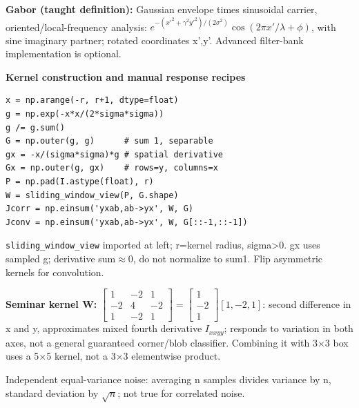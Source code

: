 \documentclass[a4paper]{article}
\newcommand{\key}[1]{\textbf{#1}}
\newcommand{\Topic}[1]{\par\vspace{1.7pt}\noindent
  {\fontsize{7.7}{8.0}\selectfont\bfseries #1}\par\vspace{0.3pt}}
\newcommand{\smat}[1]{\left[\begin{smallmatrix}#1\end{smallmatrix}\right]}
\newcounter{sheet}
\newcounter{sheetcolumn}
\newlength{\colwidth}
\newenvironment{sheetcol}[1][7.0]{\stepcounter{sheetcolumn}
  \begin{lrbox}{\columnbox}\begin{minipage}[t]{\colwidth}\vspace{0pt}
  \fontsize{#1}{\dimexpr#1pt+0.6pt\relax}\selectfont}
  {\end{minipage}\end{lrbox}
  \typeout{CV1COL|\thesheet|\thesheetcolumn|\the\dimexpr\ht\columnbox+\dp\columnbox\relax}
  \usebox{\columnbox}\ignorespacesafterend}
\newcommand{\Sep}{\hfill}
\begin{document}
\begin{sheetcol}[6.54]
\key{Gabor (taught definition):} Gaussian envelope times sinusoidal carrier, oriented/local-frequency analysis: \(e^{-(x'^2+\gamma^2y'^2)/(2\sigma^2)}\cos(2\pi x'/\lambda+\phi)\), with sine imaginary partner; rotated coordinates x',y'. Advanced filter-bank implementation is optional.

\Topic{Kernel construction and manual response recipes}
\begin{lstlisting}
x = np.arange(-r, r+1, dtype=float)
g = np.exp(-x*x/(2*sigma*sigma))
g /= g.sum()
G = np.outer(g, g)      # sum 1, separable
gx = -x/(sigma*sigma)*g # spatial derivative
Gx = np.outer(g, gx)    # rows=y, columns=x
P = np.pad(I.astype(float), r)
W = sliding_window_view(P, G.shape)
Jcorr = np.einsum('yxab,ab->yx', W, G)
Jconv = np.einsum('yxab,ab->yx', W, G[::-1,::-1])
\end{lstlisting}
\texttt{sliding\_window\_view} imported at left; r=kernel radius, sigma>0. gx uses sampled g; derivative sum\(\approx0\), do not normalize to sum1. Flip asymmetric kernels for convolution.

\key{Seminar kernel W:} \(\smat{1&-2&1\\-2&4&-2\\1&-2&1}=\smat{1\\-2\\1}[1,-2,1]\): second difference in x and y, approximates mixed fourth derivative \(I_{xxyy}\); responds to variation in both axes, not a general guaranteed corner/blob classifier. Combining it with 3\(\times\)3 box uses a 5\(\times\)5 kernel, not a 3\(\times\)3 elementwise product.

Independent equal-variance noise: averaging n samples divides variance by n, standard deviation by \(\sqrt n\); not true for correlated noise.
\end{sheetcol}\Sep
\end{document}
